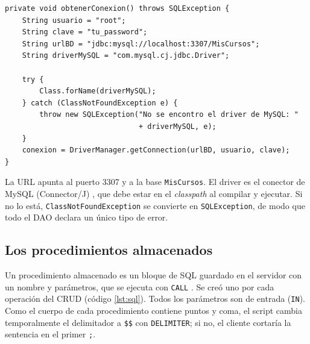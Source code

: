 \documentclass[10pt,a4paper]{article}
\begin{document}
\begin{lstlisting}[caption={Conexión JDBC en CarreraDAO (\texttt{obtenerConexion})}]
private void obtenerConexion() throws SQLException {
    String usuario = "root";
    String clave = "tu_password";
    String urlBD = "jdbc:mysql://localhost:3307/MisCursos";
    String driverMySQL = "com.mysql.cj.jdbc.Driver";

    try {
        Class.forName(driverMySQL);
    } catch (ClassNotFoundException e) {
        throw new SQLException("No se encontro el driver de MySQL: "
                               + driverMySQL, e);
    }
    conexion = DriverManager.getConnection(urlBD, usuario, clave);
}
\end{lstlisting}

La URL apunta al puerto 3307 y a la base \texttt{MisCursos}. El driver es el conector de MySQL (Connector/J) \cite{mysql_connectorj}, que debe estar en el \textit{classpath} al compilar y ejecutar. Si no lo está, \texttt{ClassNotFoundException} se convierte en \texttt{SQLException}, de modo que todo el DAO declara un único tipo de error.

\subsection{Los procedimientos almacenados}

Un procedimiento almacenado es un bloque de SQL guardado en el servidor con un nombre y parámetros, que se ejecuta con \texttt{CALL} \cite{mysql_create_procedure}. Se creó uno por cada operación del CRUD (código \ref{lst:sql}). Todos los parámetros son de entrada (\texttt{IN}). Como el cuerpo de cada procedimiento contiene puntos y coma, el script cambia temporalmente el delimitador a \texttt{\$\$} con \texttt{DELIMITER}; si no, el cliente cortaría la sentencia en el primer \texttt{;}.


\end{document}
